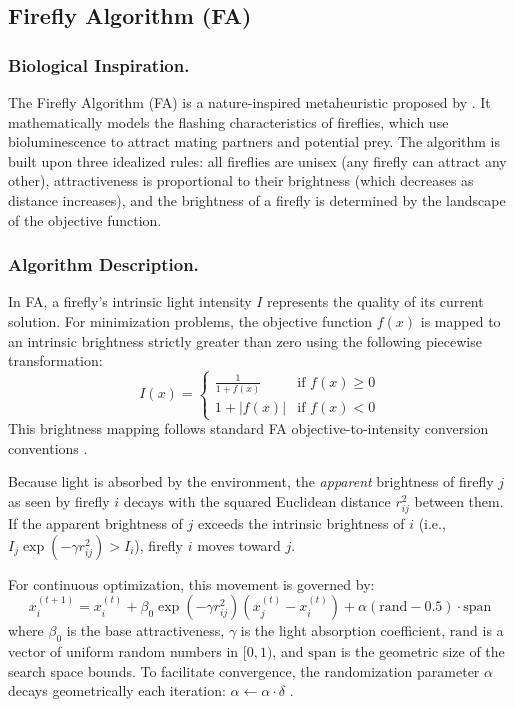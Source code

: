 \subsection{Firefly Algorithm (FA)}

\subsubsection{Biological Inspiration.}
The Firefly Algorithm (FA) is a nature-inspired metaheuristic proposed by \textcite{Yang2008}. It mathematically models the flashing characteristics of fireflies, which use bioluminescence to attract mating partners and potential prey. The algorithm is built upon three idealized rules: all fireflies are unisex (any firefly can attract any other), attractiveness is proportional to their brightness (which decreases as distance increases), and the brightness of a firefly is determined by the landscape of the objective function.

\subsubsection{Algorithm Description.}
In FA, a firefly's intrinsic light intensity $I$ represents the quality of its current solution. For minimization problems, the objective function $f(x)$ is mapped to an intrinsic brightness strictly greater than zero using the following piecewise transformation:
$$I(x) = \begin{cases} 
\frac{1}{1 + f(x)} & \text{if } f(x) \ge 0 \\ 
1 + |f(x)| & \text{if } f(x) < 0 
\end{cases}$$
This brightness mapping follows standard FA objective-to-intensity conversion conventions \autocite{Yang2008,YangHe2013}.

Because light is absorbed by the environment, the \textit{apparent} brightness of firefly $j$ as seen by firefly $i$ decays with the squared Euclidean distance $r_{ij}^2$ between them. If the apparent brightness of $j$ exceeds the intrinsic brightness of $i$ (i.e., $I_j \exp(-\gamma r_{ij}^2) > I_i$), firefly $i$ moves toward $j$.

For continuous optimization, this movement is governed by:
$$x_i^{(t+1)} = x_i^{(t)} + \beta_0 \exp(-\gamma r_{ij}^2)(x_j^{(t)} - x_i^{(t)}) + \alpha (\text{rand} - 0.5) \cdot \text{span}$$
where $\beta_0$ is the base attractiveness, $\gamma$ is the light absorption coefficient, $\text{rand}$ is a vector of uniform random numbers in $[0, 1)$, and $\text{span}$ is the geometric size of the search space bounds. To facilitate convergence, the randomization parameter $\alpha$ decays geometrically each iteration: $\alpha \gets \alpha \cdot \delta$ \autocite{Yang2008,YangHe2013}.

